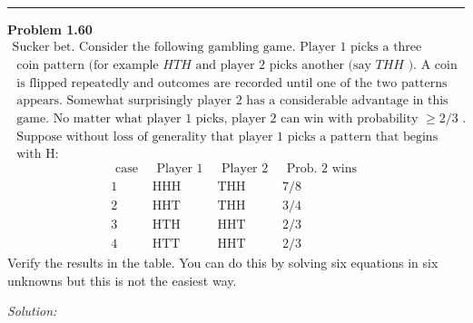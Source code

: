 \documentclass[a4paper, 11pt]{article}
\newenvironment{problem}[2][Problem]
    { \begin{mdframed}[backgroundcolor=gray!20] \textbf{#1 #2} \\}
    {  \end{mdframed}}
\newenvironment{solution}
    {\textit{Solution:}}
    {}
\begin{document}
\noindent\rule{7in}{2.8pt}
\begin{problem}{1.60}
  \begin{equation*}
  \begin{array}{l}\text {Sucker bet. Consider the following gambling game. Player 1 picks a three } \\ \text { coin pattern (for example } H T H \text { and player 2 picks another (say } T H H \text { ). A coin } \\ \text { is flipped repeatedly and outcomes are recorded until one of the two patterns } \\ \text { appears. Somewhat surprisingly player 2 has a considerable advantage in this } \\ \text { game. No matter what player 1 picks, player 2 can win with probability } \geq 2 / 3 \text { . } \\ \text { Suppose without loss of generality that player 1 picks a pattern that begins } \\ \text { with H: }\end{array}
  \end{equation*}
  \begin{equation*}
  \begin{array}{cccc}\hline \text { case } & \text { Player 1 } & \text { Player 2 } & \text { Prob. 2 wins } \\ \hline 1 & \mathrm{HHH} & \mathrm{THH} & 7 / 8 \\ 2& \mathrm{HHT} & \mathrm{THH} & 3 / 4 \\ 3 & \mathrm{HTH} & \mathrm{HHT} & 2 / 3 \\ 4 & \mathrm{HTT} & \mathrm{HHT} & 2 / 3\end{array}
  \end{equation*}
  Verify the results in the table. You can do this by solving six equations in six unknowns but this is not the easiest way.
\end{problem}

\begin{solution}

\end{solution}
\end{document}
